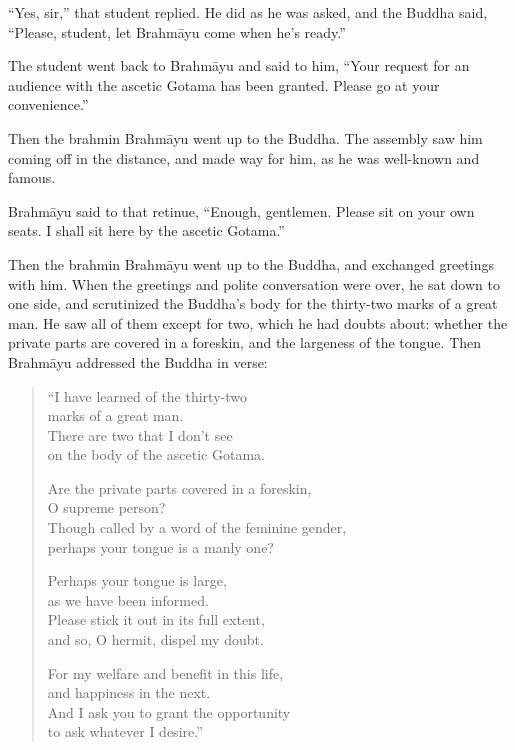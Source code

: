 \documentclass[12pt,openany]{book}%
\begin{document}
“Yes, sir,” that student replied. He did as he was asked, and the Buddha said, “Please, student, let \textsanskrit{Brahmāyu} come when he’s ready.” 

The student went back to \textsanskrit{Brahmāyu} and said to him, “Your request for an audience with the ascetic Gotama has been granted. Please go at your convenience.” 

Then the brahmin \textsanskrit{Brahmāyu} went up to the Buddha. The assembly saw him coming off in the distance, and made way for him, as he was well-known and famous. 

\textsanskrit{Brahmāyu} said to that retinue, “Enough, gentlemen. Please sit on your own seats. I shall sit here by the ascetic Gotama.” 

Then the brahmin \textsanskrit{Brahmāyu} went up to the Buddha, and exchanged greetings with him. When the greetings and polite conversation were over, he sat down to one side, and scrutinized the Buddha’s body for the thirty-two marks of a great man. He saw all of them except for two, which he had doubts about: whether the private parts are covered in a foreskin, and the largeness of the tongue. Then \textsanskrit{Brahmāyu} addressed the Buddha in verse: 

\begin{verse}%
“I have learned of the thirty-two \\
marks of a great man. \\
There are two that I don’t see \\
on the body of the ascetic Gotama. 

Are the private parts covered in a foreskin, \\
O supreme person? \\
Though called by a word of the feminine gender, \\
perhaps your tongue is a manly one? 

Perhaps your tongue is large, \\
as we have been informed. \\
Please stick it out in its full extent, \\
and so, O hermit, dispel my doubt. 

For my welfare and benefit in this life, \\
and happiness in the next. \\
And I ask you to grant the opportunity \\
to ask whatever I desire.” 

%
\end{verse}
\end{document}
